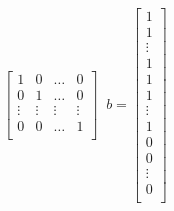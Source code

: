 \documentclass[a4paper]{article}
\begin{document}
\begin{latin}
\begin{enumerate}
\begin{equation*}
\begin{bmatrix}
			1 & 0 & \dots & 0\\
			0 & 1 & \dots & 0\\
			\vdots & \vdots & \vdots & \vdots \\
			0 & 0 & \dots & 1\\
		\end{bmatrix}
		\; \; 
		b = \begin{bmatrix} 
			1 \\
			1 \\
			\vdots \\
			1 \\
			1\\
			1 \\
			\vdots \\
			1 \\
			0 \\
			0 \\
			\vdots \\
			0 \\
		\end{bmatrix}
	\end{equation*}
\end{enumerate}

\end{latin}
\end{document}
